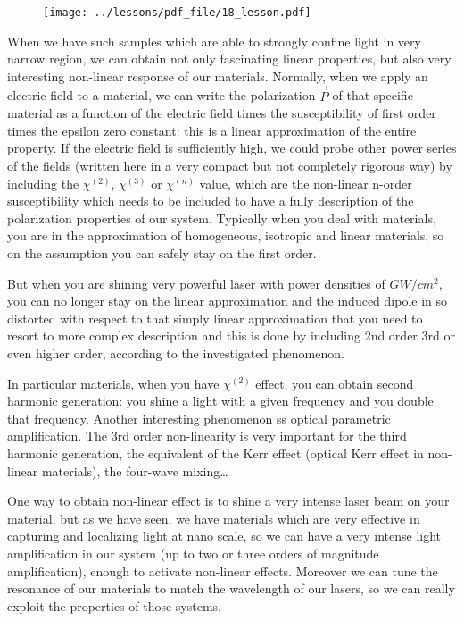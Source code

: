 \documentclass[../main/main.tex]{subfiles}
\begin{document}
\begin{figure}[h!]
\centering
\texttt{[image: ../lessons/pdf\_file/18\_lesson.pdf]}
\end{figure}

\newpage

When we have such samples which are able to strongly confine light in very narrow region, we can obtain not only fascinating linear properties, but also very interesting non-linear response of our materials.
Normally, when we apply an electric field to a material, we can write the polarization $\vec{P}$ of that specific material as a function of the electric field times the susceptibility of first order times the epsilon zero constant: this is a linear approximation of the entire property.
If the electric field is sufficiently high, we could probe other power series of the fields (written here in a very compact but not completely rigorous way) by including the $\chi^{(2)}$, $\chi^{(3)}$ or $\chi^{(n)}$ value, which are the non-linear n-order susceptibility which needs to be included to have a fully description of the polarization properties of our system.
Typically when you deal with materials, you are in the approximation of homogeneous, isotropic and linear materials, so on the assumption you can safely stay on the first order. 

But when you are shining very powerful laser with power densities of $GW/cm^2$, you can no longer stay on the linear approximation and the induced dipole in so distorted with respect to that simply linear approximation that you need to resort to more complex description and this is done by including 2nd order 3rd or even higher order, according to the investigated phenomenon.

In particular materials, when you have $\chi^{(2)}$ effect, you can obtain second harmonic generation: you shine a light with a given frequency and you double that frequency. 
Another interesting phenomenon ss optical parametric amplification.
The 3rd order non-linearity is very important for the third harmonic generation, the equivalent of the Kerr effect (optical Kerr effect in non-linear materials), the four-wave mixing… 

One way to obtain non-linear effect is to shine a very intense laser beam on your material, but as we have seen, we have materials which are very effective in capturing and localizing light at nano scale, so we can have a very intense light amplification in our system (up to two or three orders of magnitude amplification), enough to activate non-linear effects. 
Moreover we can tune the resonance of our materials to match the wavelength of our lasers, so we can really exploit the properties of those systems.
\end{document}

